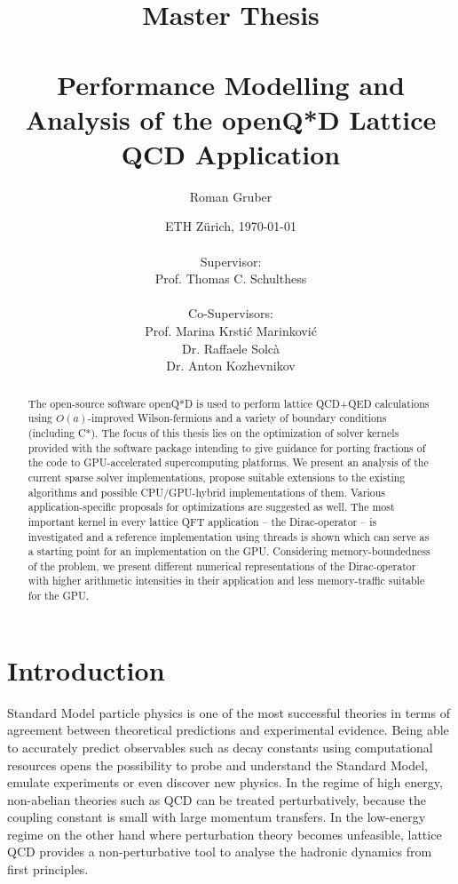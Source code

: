 \documentclass{article}
\title{Master Thesis \\~\\ Performance Modelling and Analysis of the openQ*D Lattice QCD Application}
\author{Roman Gruber}
\date{ETH Zürich, \today \\~\\ Supervisor: \\ Prof. Thomas C. Schulthess \\~\\ Co-Supervisors: \\ Prof. Marina Krstić Marinković \\ Dr. Raffaele Solcà \\ Dr. Anton Kozhevnikov}
\theoremstyle{plain} %
\theoremstyle{convention} %
\theoremstyle{remark} %
\numberwithin{equation}{section}
\begin{document}
\maketitle

\begin{abstract}

The open-source software openQ*D is used to perform lattice QCD+QED calculations using $O(a)$-improved Wilson-fermions and a variety of boundary conditions (including C*). The focus of this thesis lies on the optimization of solver kernels provided with the software package intending to give guidance for porting fractions of the code to GPU-accelerated supercomputing platforms. We present an analysis of the current sparse solver implementations, propose suitable extensions to the existing algorithms and possible CPU/GPU-hybrid implementations of them.  Various application-specific proposals for optimizations are suggested as well. The most important kernel in every lattice QFT application -- the Dirac-operator -- is investigated and a reference implementation using threads is shown which can serve as a starting point for an implementation on the GPU. Considering memory-boundedness of the problem, we present different numerical representations of the Dirac-operator with higher arithmetic intensities in their application and less memory-traffic suitable for the GPU.

\end{abstract}

\doclicenseThis

\newpage

\tableofcontents

\newpage

\section{Introduction}

Standard Model particle physics is one of the most successful theories in terms of agreement between theoretical predictions and experimental evidence. Being able to accurately predict observables such as decay constants using computational resources opens the possibility to probe and understand the Standard Model, emulate experiments or even discover new physics. In the regime of high energy, non-abelian theories such as \acrshort{QCD} can be treated perturbatively, because the coupling constant is small with large momentum transfers. In the low-energy regime on the other hand where perturbation theory becomes unfeasible, lattice QCD provides a non-perturbative tool to analyse the hadronic dynamics from first principles.
\end{document}
